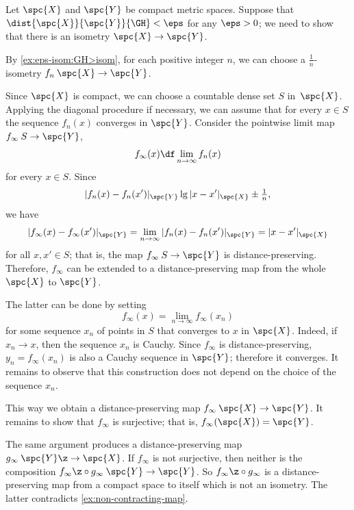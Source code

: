 \label{page:GH-2-proof}
Let $\spc{X}$ and $\spc{Y}$ be compact metric spaces.
Suppose that $\dist{\spc{X}}{\spc{Y}}{\GH}<\eps$ for any $\eps>0$;
we need to show that there is an isometry $\spc{X}\to\spc{Y}$.

By \ref{ex:eps-isom:GH>isom}, for each positive integer $n$, we can choose a $\tfrac1n$-isometry $f_n\:\spc{X}\to\spc{Y}$.

Since $\spc{X}$ is compact, 
we can choose a countable dense set
$S$ in~$\spc{X}$.
Applying the diagonal procedure if necessary, we can assume that for every $x \in S$ the sequence $f_n(x)$ 
converges in $\spc{Y}$. 
Consider the pointwise limit map  $f_\infty \: S \to \spc{Y}$,
 $$f_\infty(x) \df \lim_{n\to\infty} f_n (x)$$ for every $x \in S$. 
Since $$|f_n (x)- f_n (x')|_{\spc{Y}}\lg |x- x'|_\spc{X} \pm\tfrac1n,$$ 
we have 
$$|f_\infty(x)-f_\infty (x')|_{\spc{Y}} 
= \lim_{n\to\infty} |f_n(x)-f_n (x')|_{\spc{Y}} 
= |x -x'|_\spc{X}$$ for all
$x, x' \in S$; 
that is, the map $f_\infty\:S\to \spc{Y}$ is distance-preserving. 
Therefore, $f_\infty$ can be extended to a distance-preserving map from the whole $\spc{X}$ to $\spc{Y}$.

The latter can be done by setting 
$$f_\infty(x)=\lim_{n\to\infty} f_\infty(x_n)$$ 
for some sequence $x_n$ of points  in $S$
that converges to $x$ in $\spc{X}$.
Indeed, if $x_n\to x$, then the sequence $x_n$ is Cauchy.
Since $f_\infty$ is distance-preserving, $y_n=f_\infty(x_n)$ is also a Cauchy sequence in $\spc{Y}$;
therefore it converges.
It remains to observe that this construction does not depend on the choice of the sequence $x_n$.

This way we obtain a distance-preserving map $f_\infty\:\spc{X}\to \spc{Y}$. 
It remains to show that $f_\infty$ is surjective; that is, $f_\infty(\spc{X})=\spc{Y}$.

The same argument produces a distance-preserving map $g_\infty\:\spc{Y}\z\to \spc{X}$.
If $f_\infty$ is not surjective, then neither is the composition $f_\infty\z\circ g_\infty\:\spc{Y}\to \spc{Y}$.
So $f_\infty \z\circ g_\infty$ is a distance-preserving map from a compact space to itself which is not an isometry.
The latter contradicts \ref{ex:non-contracting-map}. 
\qeds
















